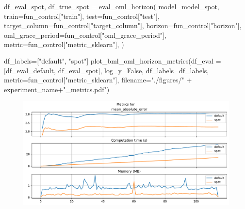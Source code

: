 \documentclass[
  letterpaper,
  DIV=11,
  numbers=noendperiod]{scrreprt}
\newenvironment{Shaded}{\begin{snugshade}}{\end{snugshade}}
\newcommand{\NormalTok}[1]{\textcolor[rgb]{0.00,0.23,0.31}{#1}}
\newcommand{\OperatorTok}[1]{\textcolor[rgb]{0.37,0.37,0.37}{#1}}
\newcommand{\StringTok}[1]{\textcolor[rgb]{0.13,0.47,0.30}{#1}}
\newcommand{\VariableTok}[1]{\textcolor[rgb]{0.07,0.07,0.07}{#1}}
\begin{document}
\begin{Shaded}
\begin{Highlighting}[]
\NormalTok{df\_eval\_spot, df\_true\_spot }\OperatorTok{=}\NormalTok{ eval\_oml\_horizon(}
\NormalTok{                    model}\OperatorTok{=}\NormalTok{model\_spot,}
\NormalTok{                    train}\OperatorTok{=}\NormalTok{fun\_control[}\StringTok{"train"}\NormalTok{],}
\NormalTok{                    test}\OperatorTok{=}\NormalTok{fun\_control[}\StringTok{"test"}\NormalTok{],}
\NormalTok{                    target\_column}\OperatorTok{=}\NormalTok{fun\_control[}\StringTok{"target\_column"}\NormalTok{],}
\NormalTok{                    horizon}\OperatorTok{=}\NormalTok{fun\_control[}\StringTok{"horizon"}\NormalTok{],}
\NormalTok{                    oml\_grace\_period}\OperatorTok{=}\NormalTok{fun\_control[}\StringTok{"oml\_grace\_period"}\NormalTok{],}
\NormalTok{                    metric}\OperatorTok{=}\NormalTok{fun\_control[}\StringTok{"metric\_sklearn"}\NormalTok{],}
\NormalTok{                )}
\end{Highlighting}
\end{Shaded}

\begin{Shaded}
\begin{Highlighting}[]
\NormalTok{df\_labels}\OperatorTok{=}\NormalTok{[}\StringTok{"default"}\NormalTok{, }\StringTok{"spot"}\NormalTok{]}
\NormalTok{plot\_bml\_oml\_horizon\_metrics(df\_eval }\OperatorTok{=}\NormalTok{ [df\_eval\_default, df\_eval\_spot], log\_y}\OperatorTok{=}\VariableTok{False}\NormalTok{, df\_labels}\OperatorTok{=}\NormalTok{df\_labels, metric}\OperatorTok{=}\NormalTok{fun\_control[}\StringTok{"metric\_sklearn"}\NormalTok{], filename}\OperatorTok{=}\StringTok{"./figures/"} \OperatorTok{+}\NormalTok{ experiment\_name}\OperatorTok{+}\StringTok{"\_metrics.pdf"}\NormalTok{)}
\end{Highlighting}
\end{Shaded}

\begin{figure}[H]

{\centering \includegraphics{024_spot_hpt_river_friedman_hatr_files/figure-pdf/cell-34-output-1.pdf}

}

\end{figure}
\end{document}
